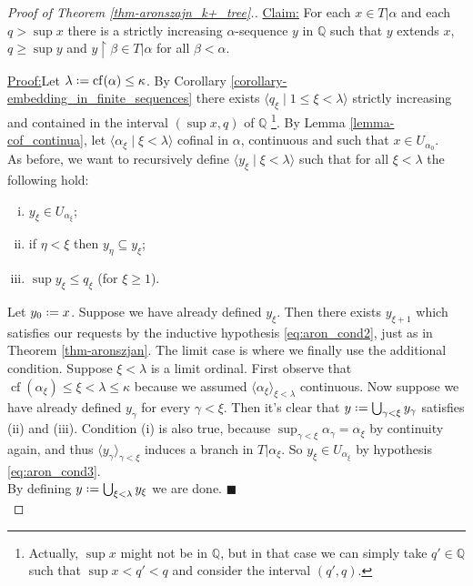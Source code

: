 \documentclass[12pt,a4paper]{report}
\theoremstyle{definition}
\theoremstyle{num.custom-title}
\newenvironment{claim}[1]{\par\noindent\underline{Claim#1:}\space}{} %
\newenvironment{claimproof}[1]{\par\noindent\underline{Proof:}\space#1}{\leavevmode\unskip\penalty9999 \hbox{}\nobreak\hfill\quad\hbox{$\blacksquare$}} %
\DeclareMathOperator{\sse}{\subseteq}
\DeclareMathOperator{\height}{height}
\DeclareMathOperator{\length}{length}
\DeclareMathOperator{\restr}{\upharpoonright}
\DeclareMathOperator{\cf}{cf}
\newcommand{\Q}{\mathbb{Q}}
\newcommand*{\defeq}{\mathrel{\rlap{%
                     \raisebox{0.3ex}{$\cdot$}}%
                     \raisebox{-0.3ex}{$\cdot$}}%
                     =}
\begin{document}
\begin{proof}[Proof of Theorem \ref{thm-aronszajn_k+_tree}.]
\begin{claim}{}
For each $x \in T|\alpha$ and each $q > \sup x$ there is a strictly increasing $\alpha$-sequence $y$ in $\Q$ such that $y$ extends $x$, $q \geq \sup y$ and $y \restr \beta \in T|\alpha$ for all $\beta<\alpha$.
\begin{claimproof}
Let $\lambda \defeq \cf(\alpha) \leq \kappa$. By Corollary \ref{corollary-embedding_in_finite_sequences} there exists $\langle q_\xi \mid 1 \leq \xi < \lambda \rangle$ strictly increasing and contained in the interval $(\sup x, q)$ of $\Q$ \footnote{Actually, $\sup x$ might not be in $\Q$, but in that case we can simply take $q' \in \Q$ such that $\sup x < q' < q$ and consider the interval $(q',q)$.}. By Lemma 	\ref{lemma-cof_continua}, let $\langle \alpha_\xi \mid \xi < \lambda \rangle$ cofinal in $\alpha$, continuous and such that $x \in U_{\alpha_0}$.\\
As before, we want to recursively define $\langle y_\xi \mid \xi < \lambda \rangle$ such that for all $\xi < \lambda$ the following hold:
\begin{enumerate}[(i)]
\item $y_\xi \in U_{\alpha_\xi}$;
\item if $\eta < \xi$ then $y_\eta \sse y_\xi$;
\item $\sup y_\xi \leq q_\xi$ (for $\xi \geq 1$).
\end{enumerate}
Let $y_0 \defeq x$. Suppose we have already defined $y_\xi$. Then there exists $y_{\xi+1}$ which satisfies our requests by the inductive hypothesis \eqref{eq:aron_cond2}, just as in Theorem \ref{thm-aronszjan}. The limit case is where we finally use the additional condition. Suppose $\xi < \lambda$ is a limit ordinal. First observe that $\cf(\alpha_\xi) \leq \xi < \lambda \leq \kappa$ because we assumed $\langle \alpha_\xi \rangle_{\xi < \lambda}$ continuous. Now suppose we have already defined $y_\gamma$ for every $\gamma < \xi$. Then it's clear that $y \defeq \bigcup_{\gamma < \xi} y_\gamma$ satisfies (ii) and (iii). Condition (i) is also true, 
because $\sup_{\gamma < \xi} \alpha_\gamma = \alpha_\xi$ by continuity again, and thus $\langle y_\gamma \rangle_{\gamma < \xi}$ induces a branch in $T|\alpha_\xi$. So $y_\xi \in U_{\alpha_\xi}$ by hypothesis \eqref{eq:aron_cond3}.\\[6pt]
By defining $y \defeq \bigcup_{\xi < \lambda} y_\xi$ we are done.
\end{claimproof}
\end{claim}\\


\end{proof}
\end{document}
